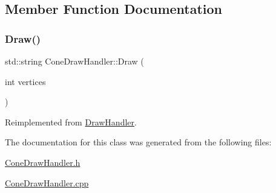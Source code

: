 \subsection{Member Function Documentation}
\mbox{\label{class_cone_draw_handler_a6cd768c6036dd1ba79f577f9907fd819}} 
\subsubsection{\texorpdfstring{Draw()}{Draw()}}
{\footnotesize\ttfamily std\+::string Cone\+Draw\+Handler\+::\+Draw (\begin{DoxyParamCaption}\item[{int}]{vertices }\end{DoxyParamCaption})\hspace{0.3cm}{\ttfamily [virtual]}}



Reimplemented from \mbox{\hyperlink{class_draw_handler_af52aafccdd1397441a17a2d36174a1e4}{Draw\+Handler}}.



The documentation for this class was generated from the following files\+:\begin{DoxyCompactItemize}
\item 
\mbox{\hyperlink{_cone_draw_handler_8h}{Cone\+Draw\+Handler.\+h}}\item 
\mbox{\hyperlink{_cone_draw_handler_8cpp}{Cone\+Draw\+Handler.\+cpp}}\end{DoxyCompactItemize}
